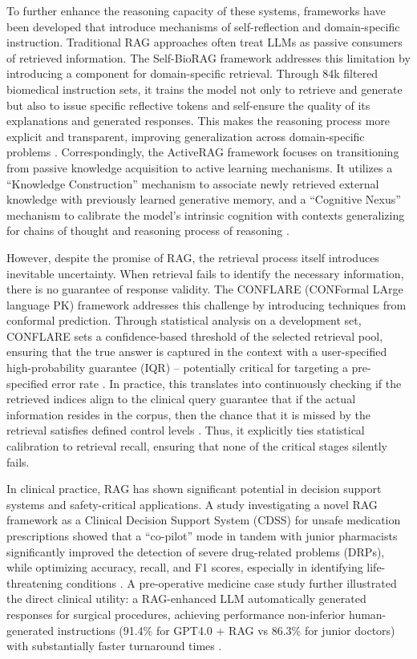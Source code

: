 \documentclass[11pt]{article}
\begin{document}
To further enhance the reasoning capacity of these systems, frameworks have been developed that introduce mechanisms of self-reflection and domain-specific instruction. Traditional RAG approaches often treat LLMs as passive consumers of retrieved information. The Self-BioRAG framework addresses this limitation by introducing a component for domain-specific retrieval. Through 84k filtered biomedical instruction sets, it trains the model not only to retrieve and generate but also to issue specific reflective tokens and self-ensure the quality of its explanations and generated responses. This makes the reasoning process more explicit and transparent, improving generalization across domain-specific problems \cite{ref176}. Correspondingly, the ActiveRAG framework focuses on transitioning from passive knowledge acquisition to active learning mechanisms. It utilizes a ``Knowledge Construction'' mechanism to associate newly retrieved external knowledge with previously learned generative memory, and a ``Cognitive Nexus'' mechanism to calibrate the model's intrinsic cognition with contexts generalizing for chains of thought and reasoning process of reasoning \cite{ref177}.

However, despite the promise of RAG, the retrieval process itself introduces inevitable uncertainty. When retrieval fails to identify the necessary information, there is no guarantee of response validity. The CONFLARE (CONFormal LArge language PK) framework addresses this challenge by introducing techniques from conformal prediction. Through statistical analysis on a development set, CONFLARE sets a confidence-based threshold of the selected retrieval pool, ensuring that the true answer is captured in the context with a user-specified high-probability guarantee (IQR) -- potentially critical for targeting a pre-specified error rate \cite{ref47}. In practice, this translates into continuously checking if the retrieved indices align to the clinical query guarantee that if the actual information resides in the corpus, then the chance that it is missed by the retrieval satisfies defined control levels \cite{ref47}. Thus, it explicitly ties statistical calibration to retrieval recall, ensuring that none of the critical stages silently fails.

In clinical practice, RAG has shown significant potential in decision support systems and safety-critical applications. A study investigating a novel RAG framework as a Clinical Decision Support System (CDSS) for unsafe medication prescriptions showed that a ``co-pilot'' mode in tandem with junior pharmacists significantly improved the detection of severe drug-related problems (DRPs), while optimizing accuracy, recall, and F1 scores, especially in identifying life-threatening conditions \cite{ref178}. A pre-operative medicine case study further illustrated the direct clinical utility: a RAG-enhanced LLM automatically generated responses for surgical procedures, achieving performance non-inferior human-generated instructions (91.4\% for GPT4.0 + RAG vs 86.3\% for junior doctors) with substantially faster turnaround times \cite{ref179}.
\end{document}

